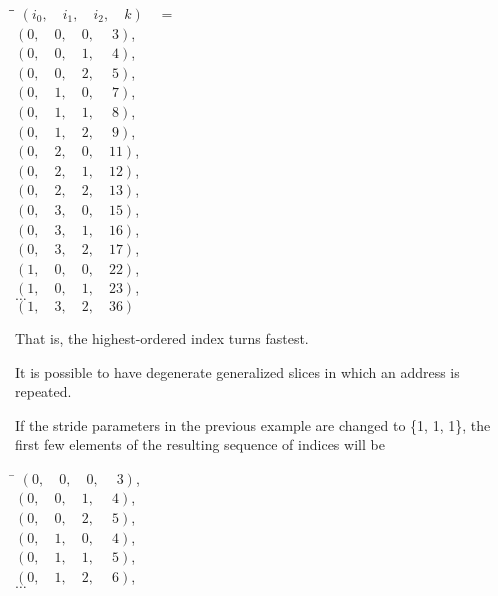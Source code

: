 \begin{tabbing}
\hspace{.5in}\=\hspace{.4in}\=\kill%
\>$(i_0,\quad i_1,\quad i_2,\quad k)\quad =$\\
\>\>$(0,\quad 0,\quad 0,\quad \ 3)$,    \\
\>\>$(0,\quad 0,\quad 1,\quad \ 4)$,    \\
\>\>$(0,\quad 0,\quad 2,\quad \ 5)$,    \\
\>\>$(0,\quad 1,\quad 0,\quad \ 7)$,    \\
\>\>$(0,\quad 1,\quad 1,\quad \ 8)$,    \\
\>\>$(0,\quad 1,\quad 2,\quad \ 9)$,    \\
\>\>$(0,\quad 2,\quad 0,\quad 11)$, \\
\>\>$(0,\quad 2,\quad 1,\quad 12)$, \\
\>\>$(0,\quad 2,\quad 2,\quad 13)$, \\
\>\>$(0,\quad 3,\quad 0,\quad 15)$, \\
\>\>$(0,\quad 3,\quad 1,\quad 16)$, \\
\>\>$(0,\quad 3,\quad 2,\quad 17)$, \\
\>\>$(1,\quad 0,\quad 0,\quad 22)$, \\
\>\>$(1,\quad 0,\quad 1,\quad 23)$, \\
\>\>$\ldots$      \\
\>\>$(1,\quad 3,\quad 2,\quad 36)$
\end{tabbing}

That is, the highest-ordered index turns fastest.
\exitexample

\pnum
It is possible to have degenerate generalized slices in which an address
is repeated.

\pnum
\enterexample
If the stride parameters in the previous
example are changed to \{1, 1, 1\}, the first few elements of the
resulting sequence of indices will be

\begin{tabbing}
\hspace{.9in}\=\kill%
\>$(0,\quad 0,\quad 0,\quad \ 3)$,  \\
\>$(0,\quad 0,\quad 1,\quad \ 4)$,  \\
\>$(0,\quad 0,\quad 2,\quad \ 5)$,  \\
\>$(0,\quad 1,\quad 0,\quad \ 4)$,  \\
\>$(0,\quad 1,\quad 1,\quad \ 5)$,  \\
\>$(0,\quad 1,\quad 2,\quad \ 6)$,  \\
\>$\ldots$
\end{tabbing}
\exitexample

